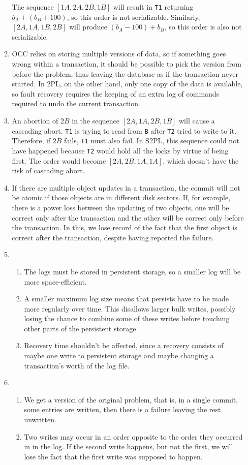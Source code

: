 \documentclass{article}
\begin{document}
\begin{enumerate}
\begin{enumerate}
    The sequence $[1A,2A,2B,1B]$ will result in \texttt{T1} returning $b_A+(b_B+100)$, so this order is not serializable. Similarly, $[2A,1A,1B,2B]$ will produce $(b_A-100)+b_B$, so this order is also not serializable.
  \item OCC relies on storing multiple versions of data, so if something goes wrong within a transaction, it should be possible to pick the version from before the problem, thus leaving the database as if the transaction never started. In 2PL, on the other hand, only one copy of the data is available, so fault recovery requires the keeping of an extra log of commands required to undo the current transaction.
  \item An abortion of $2B$ in the sequence $[2A,1A,2B,1B]$ will cause a cascading abort. \texttt{T1} is trying to read from \texttt{B} after \texttt{T2} tried to write to it. Therefore, if $2B$ fails, \texttt{T1} must also fail. In S2PL, this sequence could not have happened because \texttt{T2} would hold all the locks by virtue of being first. The order would become $[2A,2B,1A,1A]$, which doesn't have the risk of cascading abort.
  \item If there are multiple object updates in a transaction, the commit will not be atomic if those objects are in different disk sectors. If, for example, there is a power loss between the updating of two objects, one will be correct only after the transaction and the other will be correct only before the transaction. In this, we lose record of the fact that the first object is correct after the transaction, despite having reported the failure.
  \item
    \begin{enumerate}
    \item The logs must be stored in persistent storage, so a smaller log will be more space-efficient.
    \item A smaller maximum log size means that persists have to be made more regularly over time. This disallows larger bulk writes, possibly losing the chance to combine some of these writes before touching other parts of the persistent storage.
    \item Recovery time shouldn't be affected, since a recovery consists of maybe one write to persistent storage and maybe changing a transaction's worth of the log file.
    \end{enumerate}
  \item
    \begin{enumerate}
    \item We get a version of the original problem, that is, in a single commit, some entries are written, then there is a failure leaving the rest unwritten.
    \item Two writes may occur in an order opposite to the order they occurred in in the log. If the second write happens, but not the first, we will lose the fact that the first write was supposed to happen.
    \end{enumerate}
  \end{enumerate}


\end{enumerate}
\end{document}
